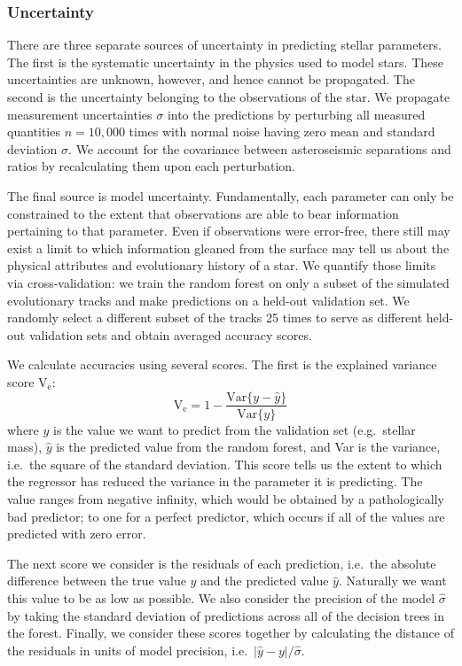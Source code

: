 \documentclass[twocolumn,twocolappendix]{aastex6}
\newcommand\abs[1]{\left|#1\right|}
\begin{document}
\subsubsection{Uncertainty}
\label{sec:uncertainties}
There are three separate sources of uncertainty in predicting stellar parameters. The first is the systematic uncertainty in the physics used to model stars. These uncertainties are unknown, however, and hence cannot be propagated. The second is the uncertainty belonging to the observations of the star. We propagate measurement uncertainties $\sigma$ into the predictions by perturbing all measured quantities $n=10,000$ times with normal noise having zero mean and standard deviation $\sigma$. We account for the covariance between asteroseismic separations and ratios by recalculating them upon each perturbation. 

The final source is model uncertainty. Fundamentally, each parameter can only be constrained to the extent that observations are able to bear information pertaining to that parameter. Even if observations were error-free, there still may exist a limit to which information gleaned from the surface may tell us about the physical attributes and evolutionary history of a star. We quantify those limits via cross-validation: we train the random forest on only a subset of the simulated evolutionary tracks and make predictions on a held-out validation set. We randomly select a different subset of the tracks 25 times to serve as different held-out validation sets and obtain averaged accuracy scores. 

We calculate accuracies using several scores. The first is the explained variance score V$_{\text{e}}$:
\begin{equation}
  \text{V}_{\text{e}} = 1 - \frac{\text{Var}\{ y - \hat y \}}{\text{Var}\{ y \}}
\end{equation}
where $y$ is the value we want to predict from the validation set (e.g.\ stellar mass), $\hat y$ is the predicted value from the random forest, and Var is the variance, i.e.\ the square of the standard deviation. This score tells us the extent to which the regressor has reduced the variance in the parameter it is predicting. The value ranges from negative infinity, which would be obtained by a pathologically bad predictor; to one for a perfect predictor, which occurs if all of the values are predicted with zero error. 

The next score we consider is the residuals of each prediction, i.e.\ the absolute difference between the true value $y$ and the predicted value $\hat y$. Naturally we want this value to be as low as possible. We also consider the precision of the model $\hat \sigma$ by taking the standard deviation of predictions across all of the decision trees in the forest. Finally, we consider these scores together by calculating the distance of the residuals in units of model precision, i.e.\ $\abs{\hat y - y} / \hat{\sigma}$. 
\end{document}
